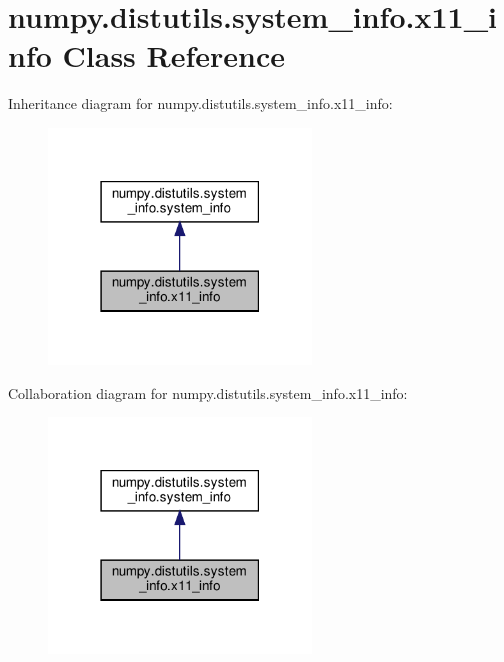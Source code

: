 \hypertarget{classnumpy_1_1distutils_1_1system__info_1_1x11__info}{}\section{numpy.\+distutils.\+system\+\_\+info.\+x11\+\_\+info Class Reference}
\label{classnumpy_1_1distutils_1_1system__info_1_1x11__info}


Inheritance diagram for numpy.\+distutils.\+system\+\_\+info.\+x11\+\_\+info\+:
\nopagebreak
\begin{figure}[H]
\begin{center}
\leavevmode
\includegraphics[width=198pt]{classnumpy_1_1distutils_1_1system__info_1_1x11__info__inherit__graph}
\end{center}
\end{figure}


Collaboration diagram for numpy.\+distutils.\+system\+\_\+info.\+x11\+\_\+info\+:
\nopagebreak
\begin{figure}[H]
\begin{center}
\leavevmode
\includegraphics[width=198pt]{classnumpy_1_1distutils_1_1system__info_1_1x11__info__coll__graph}
\end{center}
\end{figure}

